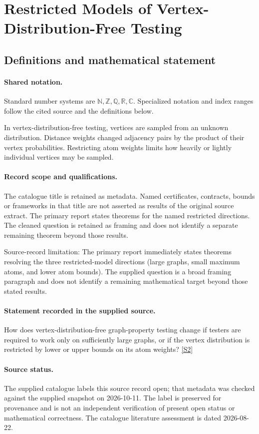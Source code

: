 \documentclass[11pt]{article}
\newcommand{\sref}[2]{\hyperlink{source:#1:#2}{[S#2]}}
\begin{document}
\section{Restricted Models of Vertex-Distribution-Free Testing}\label{statement}

\subsection{Definitions and mathematical statement}

\paragraph{Shared notation.}Standard number systems are $\mathbb N,\mathbb Z,\mathbb Q,\mathbb R,\mathbb C$. Specialized notation and index ranges follow the cited source and the definitions below.


In vertex-distribution-free testing, vertices are sampled from an unknown distribution. Distance weights changed adjacency pairs by the product of their vertex probabilities. Restricting atom weights limits how heavily or lightly individual vertices may be sampled.
\paragraph{Record scope and qualifications.}
The catalogue title is retained as metadata. Named certificates, contracts, bounds or frameworks in that title are not asserted as results of the original source extract.
The primary report states theorems for the named restricted directions. The cleaned question is retained as framing and does not identify a separate remaining theorem beyond those results.

Source-record limitation: The primary report immediately states theorems resolving the three restricted-model directions (large graphs, small maximum atoms, and lower atom bounds). The supplied question is a broad framing paragraph and does not identify a remaining mathematical target beyond those stated results.
\paragraph{Statement recorded in the supplied source.}
How does vertex-distribution-free graph-property testing change if testers are required to work only on sufficiently large graphs, or if the vertex distribution is restricted by lower or upper bounds on its atom weights? \sref{statement}{2}
\paragraph{Source status.}
The supplied catalogue labels this source record open; that metadata was checked against the supplied snapshot on 2026-10-11. The label is preserved for provenance and is not an independent verification of present open status or mathematical correctness. The catalogue literature assessment is dated 2026-08-22.
\end{document}

